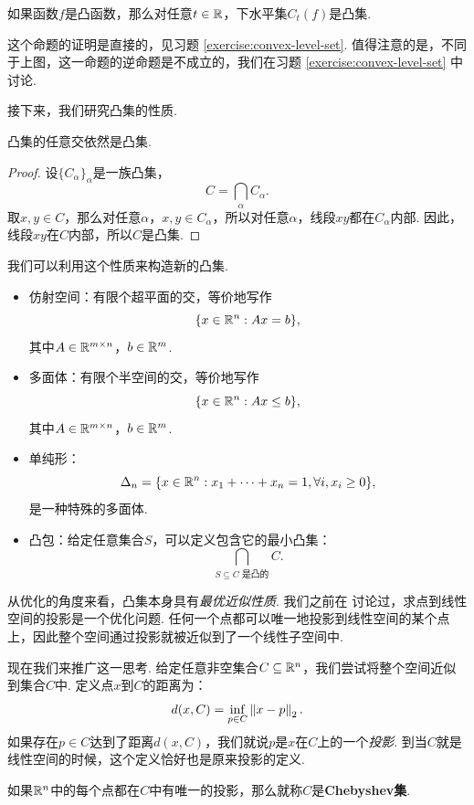 \begin{proposition}\label{prop:level-set}
    如果函数$f$是凸函数，那么对任意$t\in\mathbb{R}$，下水平集$C_t(f)$是凸集.
\end{proposition}
这个命题的证明是直接的，见习题 \ref{exercise:convex-level-set}. 值得注意的是，不同于上图，这一命题的逆命题是不成立的，我们在习题 \ref{exercise:convex-level-set} 中讨论. 

接下来，我们研究凸集的性质.

\begin{proposition}\label{prop:convex-set-intersect}
    凸集的任意交依然是凸集.
\end{proposition}
\begin{proof}
    设$\{C_\alpha\}_\alpha$是一族凸集，
    \[C=\bigcap_\alpha C_\alpha.\]
    取$x,y\in C$，那么对任意$\alpha$，$x,y\in C_\alpha$，所以对任意$\alpha$，线段$xy$都在$C_\alpha$内部. 因此，线段$xy$在$C$内部，所以$C$是凸集.
\end{proof}

我们可以利用这个性质来构造新的凸集.
\begin{example}
\begin{itemize}
    \item 仿射空间：有限个超平面的交，等价地写作
    \[\{x\in\mathbb{R}^n:Ax=b\},\]
    其中$A\in\mathbb{R}^{m\times n}$，$b\in\mathbb{R}^m$.
    \item 多面体：有限个半空间的交，等价地写作
    \[\{x\in\mathbb{R}^n:Ax\leq b\},\]
    其中$A\in\mathbb{R}^{m\times n}$，$b\in\mathbb{R}^m$.
    \item 单纯形：
    \[\Delta_n=\{x\in\mathbb{R}^n:x_1+\dots+x_n=1,\forall i,x_i\geq 0\},\]
    是一种特殊的多面体.
    \item 凸包：给定任意集合$S$，可以定义包含它的最小凸集：
    \[\bigcap_{S\subseteq C\text{ 是凸的}} C.\]
\end{itemize}
\end{example}

从优化的角度来看，凸集本身具有\textit{最优近似性质}. 我们之前在 讨论过，求点到线性空间的投影是一个优化问题. 任何一个点都可以唯一地投影到线性空间的某个点上，因此整个空间通过投影就被近似到了一个线性子空间中. 

现在我们来推广这一思考. 给定任意非空集合$C\subseteq\mathbb{R}^n$，我们尝试将整个空间近似到集合$C$中. 定义点$x$到$C$的距离为：
\[d(x,C)=\inf_{p\in C}\left\|x-p\right\|_2.\]
如果存在$p\in C$达到了距离$d(x,C)$，我们就说$p$是$x$在$C$上的一个\textit{投影}. 到当$C$就是线性空间的时候，这个定义恰好也是原来投影的定义.

如果$\mathbb{R}^n$中的每个点都在$C$中有唯一的投影，那么就称$C$是\textbf{Chebyshev集}. 

